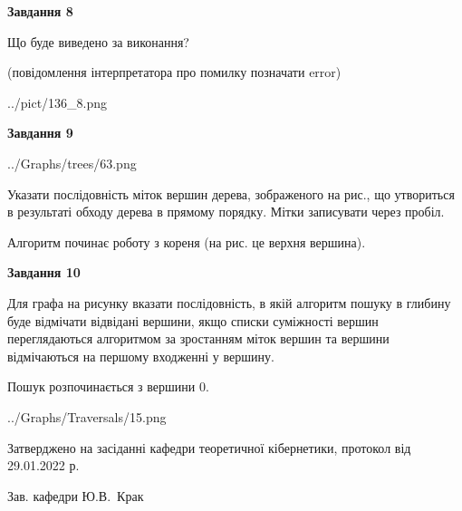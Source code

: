\documentclass[12pt, ukrainian]{article}
\begin{document}
{\begin {large}
{\begin {center}\textbf{Завдання 8}\end {center}}\par
Що буде виведено за виконання?\par
 (повідомлення інтерпретатора про помилку позначати error)\par
\begin{center}
	{../pict/136_8.png}
\end{center}
\newpage

{\begin {center}\textbf{Завдання 9}\end {center}}\par

\begin{center}
	{../Graphs/trees/63.png}
\end{center}
Указати послідовність міток вершин дерева, зображеного на рис., що утвориться в результаті обходу дерева в прямому порядку. Мітки записувати через пробіл.\par Алгоритм починає роботу з кореня (на рис. це верхня вершина).\par
\newpage

{\begin {center}\textbf{Завдання 10}\end {center}}\par
Для графа на рисунку вказати послідовність, в якій алгоритм пошуку в глибину буде відмічати відвідані вершини, якщо списки суміжності вершин переглядаються алгоритмом за зростанням міток вершин та вершини відмічаються на першому вход\-женні у вершину.\par
Пошук розпочинається з вершини 0.\par

\begin{center}
	{../Graphs/Traversals/15.png}
\end{center}\par
\newpage


\end {large}
}
{\smallskip \begin {small} Затверджено на засіданні кафедри теоретичної кібернетики, протокол  від   29.01.2022 р.\par\smallskip\smallskip
{\parbox {6.5 cm}{Зав. кафедри \dotfill Ю.В.~Крак}} \end{small}}
\end{document}
